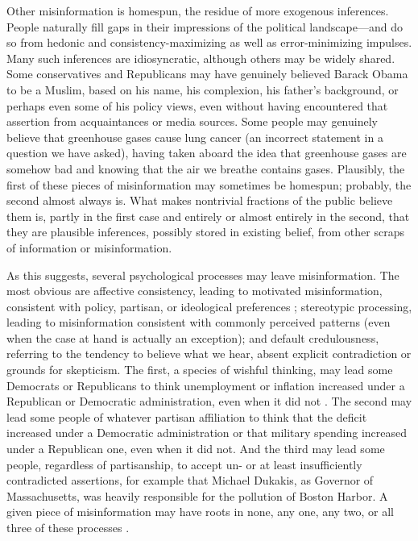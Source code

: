 \documentclass[11pt]{article}
\begin{document}
Other misinformation is homespun, the residue of more exogenous inferences. People naturally fill gaps in their impressions of the political landscape---and do so from hedonic and consistency-maximizing as well as error-minimizing impulses. Many such inferences are idiosyncratic, although others may be widely shared. Some conservatives and Republicans may have genuinely believed Barack Obama to be a Muslim, based on his name, his complexion, his father's background, or perhaps even some of his policy views, even without having encountered that assertion from acquaintances or media sources. Some people may genuinely believe that greenhouse gases cause lung cancer (an incorrect statement in a question we have asked), having taken aboard the idea that greenhouse gases are somehow bad and knowing that the air we breathe contains gases. Plausibly, the first of these pieces of misinformation may sometimes be homespun; probably, the second almost always is. What makes nontrivial fractions of the public believe them is, partly in the first case and entirely or almost entirely in the second, that they are plausible inferences, possibly stored in existing belief, from other scraps of information or misinformation.

As this suggests, several psychological processes may leave misinformation. The most obvious are affective consistency, leading to motivated misinformation, consistent with policy, partisan, or ideological preferences \citep{lord1979, taber2006}; stereotypic processing, leading to misinformation consistent with commonly perceived patterns (even when the case at hand is actually an exception); and default credulousness, referring to the tendency to believe what we hear, absent explicit contradiction or grounds for skepticism. The first, a species of wishful thinking, may lead some Democrats or Republicans to think unemployment or inflation increased under a Republican or Democratic administration, even when it did not \citep{gaines2007, bullock2015}. The second may lead some people of whatever partisan affiliation to think that the deficit increased under a Democratic administration or that military spending increased under a Republican one, even when it did not. And the third may lead some people, regardless of partisanship, to accept un- or at least insufficiently contradicted assertions, for example that Michael Dukakis, as Governor of Massachusetts, was heavily responsible for the pollution of Boston Harbor. A given piece of misinformation may have roots in none, any one, any two, or all three of these processes \citep{flynn2017}.
\end{document}
